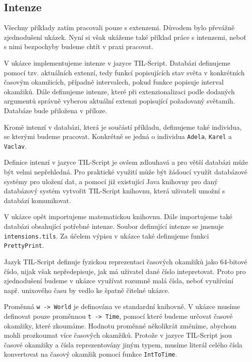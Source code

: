 \subsection{Intenze}

Všechny příklady zatím pracovali pouze s extenzemi. Důvodem bylo převážně zjednodušení ukázek.
Nyní si však ukážeme také příklad práce s intenzemi, neboť s nimi bezpochyby budeme chtít v praxi
pracovat.

V ukázce implementujeme intenze v jazyce TIL-Script. Databázi definujeme pomocí tzv. aktuálních
extenzí, tedy funkcí popisujících stav světa v konkrétních časovým okamžicích, případně intervalech,
pokud funkce popisuje interval okamžiků. Dále definujeme intenze,
které při extenzionalizaci podle dodaných argumentů správně vyberou aktuální extenzi popisující
požadovaný světamih. Databáze bude přiložena v příloze.

Kromě intenzí v databázi, která je součástí příkladu, definujeme také individua, se kterými budeme
pracovat. Konkrétně se jedná o individua \lstinline{Adela}, \lstinline{Karel} a \lstinline{Vaclav}.

Definice intenzí v jazyce TIL-Script je ovšem zdlouhavá a pro větší databázi může být velmi
nepřehledná. Pro praktické využití může být žádoucí využít databázové systémy pro uložení dat,
a pomocí již existující Java knihovny pro daný databázový systém vytvořit TIL-Script knihovnu,
která uživateli umožní s databází komunikovat.

V ukázce opět importujeme matematickou knihovnu. Dále importujeme také databázi obsahující potřebné
intenze. Soubor definující intenze se jmenuje \lstinline{intensions.tils}. Za účelem výpisu v ukázce
také definujeme funkci \lstinline{PrettyPrint}.

Jazyk TIL-Script definuje fyzickou reprezentaci časových okamžiků jako 64-bitové číslo, nijak však
nepředepisuje, jak má uživatel dané číslo intepretovat. Proto pro zjednodušení budeme v ukázce
využívat rozumně malá čísla, neboť využívání např. unixového času by vedlo ke špatně čitelné ukázce.

Proměnná \lstinline{w -> World} je definována ve standardní knihovně. V ukázce musíme definovat
pouze proměnnou \lstinline{t -> Time}, pomocí které budeme určovat časové okamžiky, které zkoumáme.
Hodnotu proměnné několikrát změníme, abychom mohli prozkoumat více časových okamžiků. Protože
v jazyce TIL-Script jsou časové okamžiky a čísla reprezentovány jiným typem, musíme literál celého
čísla konvertovat na časový okamžik pomocí funkce \lstinline{IntToTime}.

